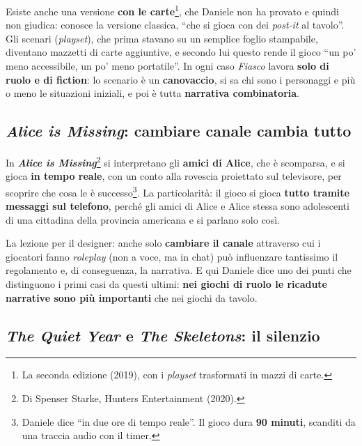 Esiste anche una versione \textbf{con le carte}\footnote{La seconda edizione (2019), con i
\emph{playset} trasformati in mazzi di carte.}, che Daniele non ha provato e quindi non giudica:
conosce la versione classica, ``che si gioca con dei \emph{post-it} al tavolo''. Gli scenari
(\emph{playset}), che prima stavano su un semplice foglio stampabile, diventano mazzetti di carte
aggiuntive, e secondo lui questo rende il gioco ``un po' meno accessibile, un po' meno
portatile''. In ogni caso \emph{Fiasco} lavora \textbf{solo di ruolo e di fiction}: lo scenario è
un \textbf{canovaccio}, si sa chi sono i personaggi e più o meno le situazioni iniziali, e poi è
tutta \textbf{narrativa combinatoria}.

\subsection{\emph{Alice is Missing}: cambiare canale cambia tutto}



In \textbf{\emph{Alice is Missing}}\footnote{Di Spenser Starke, Hunters Entertainment (2020).} si
interpretano gli \textbf{amici di Alice}, che è scomparsa, e si gioca \textbf{in tempo reale},
con un conto alla rovescia proiettato sul televisore, per scoprire che cosa le è
successo\footnote{Daniele dice ``in due ore di tempo reale''. Il gioco dura \textbf{90 minuti},
scanditi da una traccia audio con il timer.}. La particolarità: il gioco si gioca \textbf{tutto
tramite messaggi sul telefono}, perché gli amici di Alice e Alice stessa sono adolescenti di una
cittadina della provincia americana e si parlano solo così.

La lezione per il designer: anche solo \textbf{cambiare il canale} attraverso cui i giocatori
fanno \emph{roleplay} (non a voce, ma in chat) può influenzare tantissimo il regolamento e, di
conseguenza, la narrativa. E qui Daniele dice uno dei punti che distinguono i primi casi da
questi ultimi: \textbf{nei giochi di ruolo le ricadute narrative sono più importanti} che nei
giochi da tavolo.

\subsection{\emph{The Quiet Year} e \emph{The Skeletons}: il silenzio}




